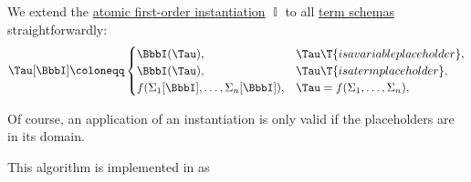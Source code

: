 \begin{algorithm}\label{alg:fol_term_schema_instantiation}
  We extend the \hyperref[def:atomic_fol_instantiation]{atomic first-order instantiation} \( \BbbI \) to all \hyperref[def:fol_term_schema]{term schemas} straightforwardly:
  \begin{equation}\label{eq:alg:fol_term_schema_instantiation}
    \Tau[\BbbI] \coloneqq \begin{cases}
      \BbbI(\Tau),                                 &\Tau \T{is a variable placeholder},   \\
      \BbbI(\Tau),                                 &\Tau \T{is a term placeholder},       \\
      f(\Sigma_1[\BbbI], \ldots, \Sigma_n[\BbbI]), &\Tau = f(\Sigma_1, \ldots, \Sigma_n), \\
    \end{cases}
  \end{equation}
\end{algorithm}
\begin{comments}
  \item Of course, an application of an instantiation is only valid if the placeholders are in its domain.
  \item This algorithm is implemented in \cite{notebook:code} as
  \begin{CodeRefDisplay}
  \end{CodeRefDisplay}
\end{comments}

